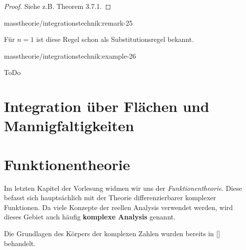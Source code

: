 \documentclass[letterpaper,10pt,german]{jupyterBook}
\begin{document}
\begin{proof}
 Siehe z.B. \cite{Bog07} Theorem 3.7.1.
\end{proof}
\begin{remark}{}{masstheorie/integrationstechnik:remark-25}



\par
Für \(n=1\) ist diese Regel schon als Substitutionsregel bekannt.
\end{remark}
\begin{example}{}{masstheorie/integrationstechnik:example-26}



\par
ToDo
\end{example}


\chapter{Integration über Flächen und Mannigfaltigkeiten}
\label{\detokenize{surfaceintegrals/surfaceintegrals:integration-uber-flachen-und-mannigfaltigkeiten}}\label{\detokenize{surfaceintegrals/surfaceintegrals::doc}}

\chapter{Funktionentheorie}
\label{\detokenize{complexanalysis/complexanalysis:funktionentheorie}}\label{\detokenize{complexanalysis/complexanalysis::doc}}
\par
Im letzten Kapitel der Vorlesung widmen wir uns der \emph{Funktionentheorie}.
Diese befasst sich hauptsächlich mit der Theorie differenzierbarer komplexer Funktionen.
Da viele Konzepte der reellen Analysis verwendet werden, wird dieses Gebiet auch häufig \textbf{komplexe Analysis} genannt.

\par
Die Grundlagen des Körpers der komplexen Zahlen wurden bereits in {[}{]} behandelt.
\end{document}
